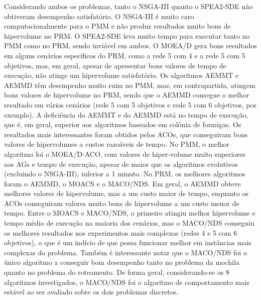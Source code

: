 Considerando ambos os problemas, tanto o NSGA-III quanto o SPEA2-SDE não obtiveram desempenho satisfatório. O NSGA-III é muito caro computacionalmente para o PMM e não produz resultados muito bons de hipervolume no PRM. O SPEA2-SDE leva muito tempo para executar tanto no PMM como no PRM, sendo inviável em ambos. O MOEA/D gera bons resultados em alguns cenários específicos do PRM, como a rede 5 com 4 e a rede 5 com 5 objetivos, mas, em geral, apesar de apresentar bons valores de tempo de execução, não atinge um hipervolume satisfatório. Os algoritmos AEMMT e AEMMD têm desempenho muito ruim no PMM, mas, em contrapartida, atingem bons valores de hipervolume no PRM, sendo que o AEMMD consegue o melhor resultado em vários cenários (rede 5 com 5 objetivos e rede 5 com 6 objetivos, por exemplo). A deficiência do AEMMT e do AEMMD está no tempo de execução, que é, em geral, superior aos algoritmos baseados em colônia de formigas. Os resultados mais interessantes foram obtidos pelos ACOs, que conseguiram bons valores de hipervolumes a custos razoáveis de tempo. No PMM, o melhor algoritmo foi o MOEA/D-ACO, com valores de hiper-volume muito superiores aos AGs e tempo de execução, apesar de maior que os algoritmos evolutivos (excluindo o NSGA-III), inferior a 1 minuto. No PRM, os melhores algoritmos foram o AEMMD, o MOACS e o MACO/NDS. Em geral, o AEMMD obteve melhores valores de hipervolume, mas a um custo maior de tempo, enquanto os ACOs conseguiram valores muito bons de hipervolume a um custo menor de tempo. Entre o MOACS e MACO/NDS, o primeiro atingiu melhor hipervolume e tempo médio de execução na maioria dos cenários, mas o MACO/NDS conseguiu os melhores resultados nos experimentos mais complexos (redes 4 e 5 com 6 objetivos), o que é um indício de que possa funcionar melhor em instâncias mais complexas do problema. Também é interessante notar que o MACO/NDS foi o único algoritmo a conseguir bom desempenho tanto no problema da mochila quanto no problema do roteamento. De forma geral, considerando-se os 8 algoritmos investigados, o MACO/NDS foi o algoritmo de comportamento mais estável ao ser avaliado sobre os dois problemas discretos.
